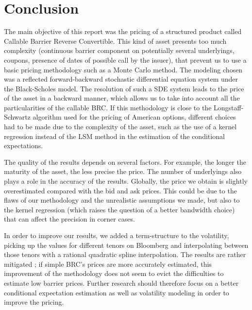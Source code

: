 \documentclass[a4paper,11pt,english]{book}
\begin{document}
\chapter*{Conclusion}
The main objective of this report was the pricing of a structured product called Callable Barrier Reverse Convertible. This kind of asset presents too much complexity (continuous barrier component on potentially several underlyings, coupons, presence of dates of possible call by the issuer), that prevent us to use a basic pricing methodology such as a Monte Carlo method. The modeling chosen was a reflected forward-backward stochastic differential equation system under the Black-Scholes model. The resolution of such a SDE system leads to the price of the asset in a backward manner, which allows us to take into account all the particularities of the callable BRC. If this methodology is close to the Longstaff-Schwartz algorithm used for the pricing of American options, different choices had to be made due to the complexity of the asset, such as the use of a kernel regression instead of the LSM method in the estimation of the conditional expectations.

The quality of the results depends on several factors. For example, the longer the maturity of the asset, the less precise the price. The number of underlyings also plays a role in the accuracy of the results. Globally, the price we obtain is slightly overestimated compared with the bid and ask prices. This could be due to the flaws of our methodology and the unrealistic assumptions we made, but also to the kernel regression (which raises the question of a better bandwidth choice) that can affect the precision in corner cases.

In order to improve our results, we added a term-structure to the volatility, picking up the values for different tenors on Bloomberg and interpolating between those tenors with a rational quadratic spline interpolation. The results are rather mitigated ; if simple BRC's prices are more accurately estimated, this improvement of the methodology does not seem to evict the difficulties to estimate low barrier prices. Further research should therefore focus on a better conditional expectation estimation as well as volatility modeling in order to improve the pricing.




\newpage
\nocite{*}



\end{document}
